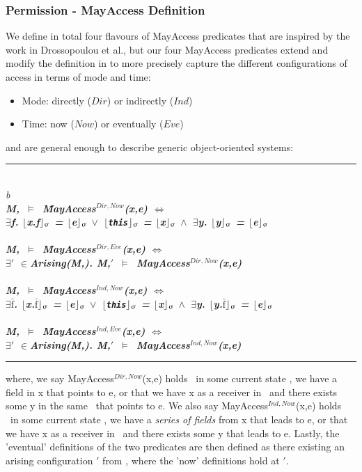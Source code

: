 \documentclass[a4paper,11pt,twoside]{article}
\makeatletter
\newenvironment{logic}
{\begin{minipage}[c]{\linewidth}  \sffamily \mdseries \begin{tabbing}}
{\end{tabbing}\end{minipage}\vspace{0.3em}}
\newcommand{\loin}{$\in$}
\newcommand{\loexists}{$\exists$}
\newcommand{\loand}{$\land$}
\newcommand{\loor} {$\lor$}
\newcommand{\losigma}{\text{$\upsigma$}}
\newcommand{\loturns} {$\vDash$}
\newcommand{\loiff} {$\iff$}
\newcommand{\loexec}[2] {$\lfloor$#1$\rfloor _{\text{#2}}$}
\newcommand{\loconj}[1] {$\bar{\text{#1}}$}
\newcommand{\lotiff} {\textit{\textls[-20]{iff}}}
\newcommand{\hr}{\rule{\linewidth}{0.4pt}}
\DeclareRobustCommand{\emp}{%
  \@nomath\em \if b\expandafter\@car\f@series\@nil
  \normalfont \else \sffamily \bfseries \fi}
\makeatother
\begin{document}
\subsubsection{Permission - MayAccess Definition}\label{MayAccess}
We define in total four flavours of MayAccess predicates that are inspired by the work in Drossopoulou et al.\cite{drossopoulou2015b}, but our four MayAccess predicates extend and modify the definition in \cite{drossopoulou2015b} to more precisely capture the different configurations of access in terms of mode and time: 
\begin{itemize}
\item Mode: directly ($Dir$) or indirectly ($Ind$)
\item Time: now ($Now$) or eventually ($Eve$)
\end{itemize}
and are general enough to describe generic object-oriented systems:

\begin{logic}
\hr\\
\emp{Definition---[MayAccess]}\\

M,\losigma\ \loturns\ \=MayAccess$^{Dir,Now}$(x,e) \loiff \\
\>\loexists f. \loexec{x.f}{\losigma} = \loexec{e}{\losigma}
\loor\
\loexec{\texttt{this}}{\losigma} = \loexec{x}{\losigma} \loand\ \loexists y. \loexec{y}{\losigma} = \loexec{e}{\losigma}\\
\\
 M,\losigma\ \loturns\ \=MayAccess$^{Dir,Eve}$(x,e) \loiff \\
\>\loexists \losigma$'$ \loin Arising(M,\losigma).
M,\losigma$'$\ \loturns\ MayAccess$^{Dir,Now}$(x,e)\\
\\
M,\losigma\ \loturns\ \=MayAccess$^{Ind,Now}$(x,e) \loiff \\
\>\loexists \loconj{f}. \loexec{x.\loconj{f}}{\losigma} = \loexec{e}{\losigma}
\loor\
\loexec{\texttt{this}}{\losigma} = \loexec{x}{\losigma} \loand\ \loexists y. \loexec{y.\loconj{f}}{\losigma} = \loexec{e}{\losigma}\\
\\
M,\losigma\ \loturns\ \=MayAccess$^{Ind,Eve}$(x,e) \loiff \\
\>\loexists \losigma$'$ \loin Arising(M,\losigma). M,\losigma$'$\ \loturns\ MayAccess$^{Ind,Now}$(x,e)\\
\hr
\end{logic}

where, we say MayAccess$^{Dir,Now}$(x,e) holds \lotiff\ in some current state \losigma, we have a field in x that points to e, or that we have x as a receiver in \losigma\ and there exists some y in the same \losigma\ that points to e. We also say MayAccess$^{Ind,Now}$(x,e) holds \lotiff\ in some current state \losigma, we have a \textit{series of fields} from x that leads to e, or that we have x as a receiver in \losigma\ and there exists some y that leads to e. Lastly, the 'eventual' definitions of the two predicates are then defined as there existing an arising configuration \losigma$'$ from \losigma, where the 'now' definitions hold at \losigma$'$.\\
\end{document}
